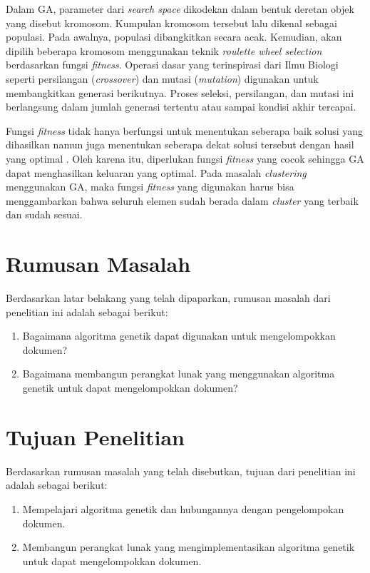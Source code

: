 Dalam GA, parameter dari \textit{search space} dikodekan dalam bentuk deretan objek yang disebut kromosom. Kumpulan kromosom tersebut lalu dikenal sebagai populasi. Pada awalnya, populasi dibangkitkan secara acak. Kemudian, akan dipilih beberapa kromosom menggunakan teknik \textit{roulette wheel selection} berdasarkan fungsi \textit{fitness}. Operasi dasar yang terinspirasi dari Ilmu Biologi seperti persilangan (\textit{crossover}) dan mutasi (\textit{mutation}) digunakan untuk membangkitkan generasi berikutnya. Proses seleksi, persilangan, dan mutasi ini berlangsung dalam jumlah generasi tertentu atau sampai kondisi akhir tercapai.

Fungsi \textit{fitness} tidak hanya berfungsi untuk menentukan seberapa baik solusi yang dihasilkan namun juga menentukan seberapa dekat solusi tersebut dengan hasil yang optimal \cite{sivanandam2007introduction}. Oleh karena itu, diperlukan fungsi \textit{fitness} yang cocok sehingga GA dapat menghasilkan keluaran yang optimal. Pada masalah \textit{clustering} menggunakan GA, maka fungsi \textit{fitness} yang digunakan harus bisa menggambarkan bahwa seluruh elemen sudah berada dalam \textit{cluster} yang terbaik dan sudah sesuai.

\section{Rumusan Masalah}
\label{sec:rumusan}
Berdasarkan latar belakang yang telah dipaparkan, rumusan masalah dari penelitian ini adalah sebagai berikut:

\begin{enumerate}
 \item Bagaimana algoritma genetik dapat digunakan untuk mengelompokkan dokumen?
 \item Bagaimana membangun perangkat lunak yang menggunakan algoritma genetik untuk dapat mengelompokkan
dokumen?
\end{enumerate}

\section{Tujuan Penelitian}
\label{sec:tujuan}
Berdasarkan rumusan masalah yang telah disebutkan, tujuan dari penelitian ini adalah sebagai berikut:

\begin{enumerate}
	\item Mempelajari algoritma genetik dan hubungannya dengan pengelompokan dokumen.
	\item Membangun perangkat lunak yang mengimplementasikan algoritma genetik untuk dapat mengelompokkan
dokumen.
\end{enumerate}

